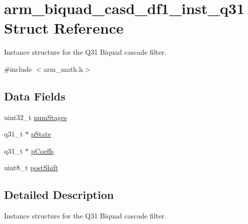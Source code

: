 \hypertarget{structarm__biquad__casd__df1__inst__q31}{\section{arm\-\_\-biquad\-\_\-casd\-\_\-df1\-\_\-inst\-\_\-q31 Struct Reference}
\label{structarm__biquad__casd__df1__inst__q31}
}


Instance structure for the Q31 Biquad cascade filter.  




{\ttfamily \#include $<$arm\-\_\-math.\-h$>$}

\subsection*{Data Fields}
\begin{DoxyCompactItemize}
\item 
uint32\-\_\-t \hyperlink{structarm__biquad__casd__df1__inst__q31_aed9c8a6224cd149e8e12b17b25b9b767}{num\-Stages}
\item 
q31\-\_\-t $\ast$ \hyperlink{structarm__biquad__casd__df1__inst__q31_adee4ba3ee8869865af7d8fa08ca913d6}{p\-State}
\item 
q31\-\_\-t $\ast$ \hyperlink{structarm__biquad__casd__df1__inst__q31_a68888e36167d81cb7836db10367a1682}{p\-Coeffs}
\item 
uint8\-\_\-t \hyperlink{structarm__biquad__casd__df1__inst__q31_a74050e9f36542bd56f4052381a82ae8f}{post\-Shift}
\end{DoxyCompactItemize}


\subsection{Detailed Description}
Instance structure for the Q31 Biquad cascade filter. 

